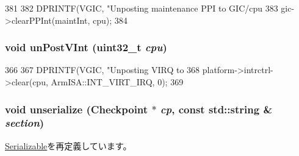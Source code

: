 \begin{DoxyCode}
381 {
382     DPRINTF(VGIC, "Unposting maintenance PPI to GIC/cpu%
383     gic->clearPPInt(maintInt, cpu);
384 }
\end{DoxyCode}
\hypertarget{classVGic_a483dd48f21752d469dcd36f3e331184a}{
\subsubsection[{unPostVInt}]{\setlength{\rightskip}{0pt plus 5cm}void unPostVInt ({\bf uint32\_\-t} {\em cpu})}}
\label{classVGic_a483dd48f21752d469dcd36f3e331184a}



\begin{DoxyCode}
366 {
367     DPRINTF(VGIC, "Unposting VIRQ to %
368     platform->intrctrl->clear(cpu, ArmISA::INT_VIRT_IRQ, 0);
369 }
\end{DoxyCode}
\hypertarget{classVGic_af22e5d6d660b97db37003ac61ac4ee49}{
\subsubsection[{unserialize}]{\setlength{\rightskip}{0pt plus 5cm}void unserialize ({\bf Checkpoint} $\ast$ {\em cp}, \/  const std::string \& {\em section})}}
\label{classVGic_af22e5d6d660b97db37003ac61ac4ee49}


\hyperlink{classSerializable_af100c4e9feabf3cd918619c88c718387}{Serializable}を再定義しています。


